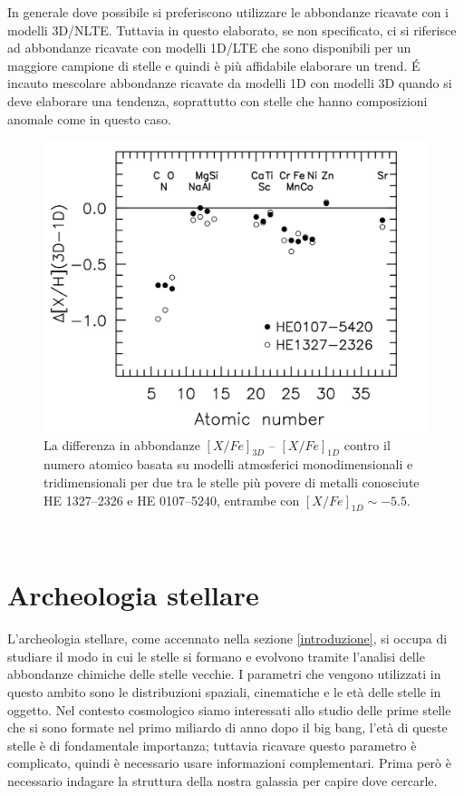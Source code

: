 \documentclass[12pt]{article}
\begin{document}
 In generale dove possibile si preferiscono utilizzare le abbondanze ricavate con i modelli 3D/NLTE. Tuttavia in questo elaborato, se non specificato, ci si riferisce ad abbondanze ricavate con modelli 1D/LTE che sono disponibili per un maggiore campione di stelle e quindi è più affidabile elaborare un trend. É incauto mescolare abbondanze ricavate da modelli 1D con modelli 3D quando si deve elaborare una tendenza, soprattutto con stelle che hanno composizioni anomale come in questo caso.

\begin{figure}[htp!]
\center
  \includegraphics[width=
0.8 \textwidth]{1d3d}
  \caption{La differenza in abbondanze $[X/Fe]_{3D}$ – $[X/Fe]_{1D}$ contro il numero atomico basata su modelli atmosferici monodimensionali e tridimensionali per due tra le stelle più povere di metalli conosciute HE 1327–2326 e HE 0107–5240, entrambe con $[X/Fe]_{1D} \sim -5.5$. \cite{Frebel_2013}  }
  \label{1d3d}
\end{figure}



\newpage
\
\newpage


\section{Archeologia stellare}

L’archeologia stellare, come accennato nella sezione \ref{introduzione}, si occupa di studiare il modo in cui le stelle si formano e evolvono tramite l’analisi delle abbondanze chimiche delle stelle vecchie. I parametri che vengono utilizzati in questo ambito sono le distribuzioni spaziali, cinematiche e le età delle stelle in oggetto. Nel contesto cosmologico siamo interessati allo studio delle prime stelle che si sono formate nel primo miliardo di anno dopo il big bang, l’età di queste stelle è di fondamentale importanza; tuttavia ricavare questo parametro è complicato, quindi è necessario usare informazioni complementari. 
Prima però è necessario indagare la struttura della nostra galassia per capire dove cercarle.
\end{document}
